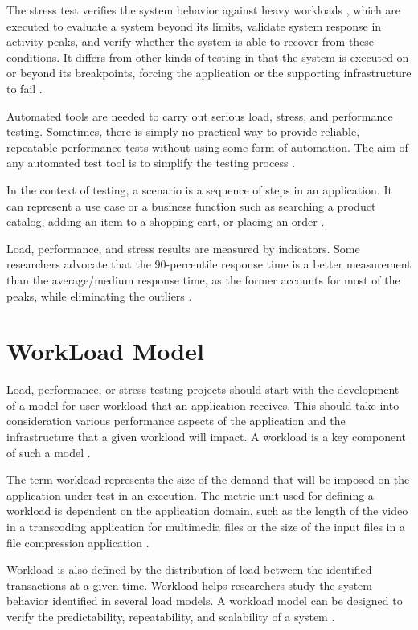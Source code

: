 \documentclass[conference]{IEEEtran}
\begin{document}
The stress test verifies the system behavior against heavy workloads \cite{Sandler2004}, which are executed to evaluate a system beyond its limits, validate system response in activity peaks, and verify whether the system is able to recover from these conditions. It differs from other kinds of testing in that the system is executed on or beyond its breakpoints, forcing the application or the supporting infrastructure to fail \cite{DiLucca2006} \cite{Molyneaux2009}.

Automated tools are needed to carry out serious load, stress, and performance testing. Sometimes, there is simply no practical way to provide reliable, repeatable performance tests without using some form of automation. The aim of any automated test tool is to simplify the testing process \cite{Molyneaux2009}.

In the context of testing, a scenario is a sequence of steps in an application. It can represent a use case or a business function such as searching a product catalog, adding an item to a shopping cart, or placing an order \cite{Corporation2007}. 

Load, performance, and stress results are measured by indicators. Some researchers advocate that the 90-percentile response time is a better measurement than the average/medium response time, as the former accounts for most of the peaks, while eliminating the outliers \cite{Jiang2010}.


\section{WorkLoad Model}

Load, performance, or stress testing projects should start with the development of a model for user workload that an application receives. This should take into consideration various performance aspects of the application and the infrastructure that a given workload will impact. A workload is a key component of such a model \cite{Molyneaux2009}.

The term workload represents the size of the demand that will be imposed on the application under test in an execution. The metric unit used for defining a workload is dependent on the application domain, such as the length of the video in a transcoding application for multimedia files or the size of the input files in a file compression application \cite{Feitelson2013} \cite{Molyneaux2009} \cite{Goncalves2014}. 

Workload is also defined by the distribution of load between the identified transactions at a given time. Workload helps researchers study the system behavior identified in several load models. A workload model can be designed to verify the predictability, repeatability, and scalability of a system \cite{Feitelson2013} \cite{Molyneaux2009}.
\end{document}
